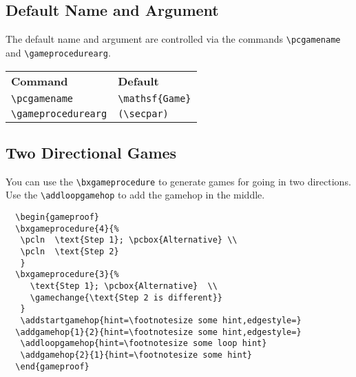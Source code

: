 \documentclass[a4paper]{report}
\begin{document}
  
  \subsection{Default Name and Argument}
  The default name and argument are controlled via the commands \lstinline$\pcgamename$ and \lstinline$\gameprocedurearg$.
  
  \begin{center}
  \begin{tabular}{ll}
  \textbf{Command} & \textbf{Default} \\
  \lstinline$\pcgamename$ & \lstinline$\mathsf{Game}$ \\
  \lstinline$\gameprocedurearg$ & \lstinline$(\secpar)$
  \end{tabular}
  \end{center}
  
  
  \subsection{Two Directional Games}
  You can use the \lstinline$\bxgameprocedure$ to generate games for going in two directions. Use the \lstinline$\addloopgamehop$
  to add the gamehop in the middle.
  
  \vspace{1cm}
  \begin{center}
  \begin{gameproof}
  \end{gameproof}
  \end{center}
  
  
  \begin{lstlisting}
  \begin{gameproof}
  \bxgameprocedure{4}{%
   \pcln  \text{Step 1}; \pcbox{Alternative} \\
   \pcln  \text{Step 2}  
   }
  \bxgameprocedure{3}{%
	 \text{Step 1}; \pcbox{Alternative}  \\
	 \gamechange{\text{Step 2 is different}}  
   }
   \addstartgamehop{hint=\footnotesize some hint,edgestyle=}
  \addgamehop{1}{2}{hint=\footnotesize some hint,edgestyle=}
   \addloopgamehop{hint=\footnotesize some loop hint}
   \addgamehop{2}{1}{hint=\footnotesize some hint}
  \end{gameproof}
  \end{lstlisting}
  
\end{document}
